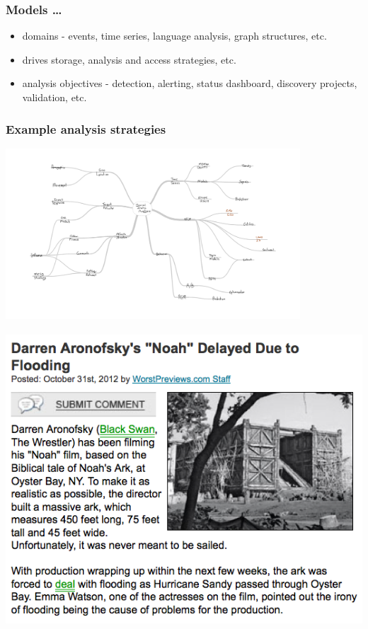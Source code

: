 \documentclass{beamer}
\begin{document}


\begin{frame}\frametitle{Models \ldots}
{\Large
\begin{itemize}
\item domains - events, time series, language analysis, graph structures, etc.
\item drives storage, analysis and access strategies, etc.
\item analysis objectives - detection, alerting, status dashboard, discovery projects, validation, etc.
\end{itemize}
}
\end{frame}

\begin{frame}\frametitle{Example analysis strategies}
  \begin{center}
    \includegraphics[width=11cm]{./imgs/mindmap.png}
  \end{center}
\end{frame}


\begin{frame}
  \begin{center}
    \includegraphics[height=11cm]{./imgs/flooding.png}
  \end{center}
\end{frame}
\end{document}
